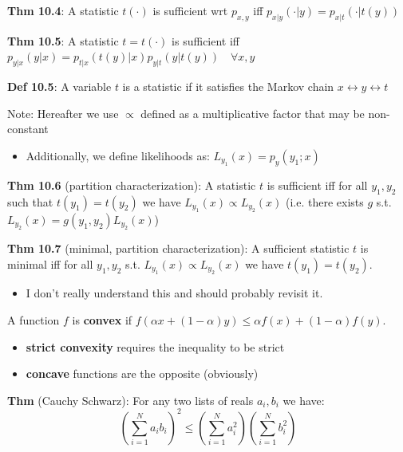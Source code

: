 \documentclass[12pt]{article} %
\begin{document}
\textbf{Thm 10.4}: A statistic $t(\cdot)$ is sufficient wrt $p_{x,y}$ iff $p_{x|y}(\cdot|y) = p_{x|t}(\cdot|t(y))$

\textbf{Thm 10.5}: A statistic $t = t(\cdot)$ is sufficient iff $p_{y|x}(y|x) = p_{t|x}(t(y)|x) p_{y|t}(y|t(y)) \quad \forall x,y$

\separate

\textbf{Def 10.5}: A variable $t$ is a statistic if it satisfies the Markov chain $x \leftrightarrow y \leftrightarrow t$

Note: Hereafter we use $\propto$ defined as a multiplicative factor that may be non-constant
\begin{itemize}[topsep=-1pt, itemsep=-1pt]
    \item Additionally, we define likelihoods as: $L_{y_1}(x) = p_y(y_1;x)$
\end{itemize}

\textbf{Thm 10.6} (partition characterization): A statistic $t$ is sufficient iff for all $y_1,y_2$ such that $t(y_1) = t(y_2)$ we have $L_{y_1}(x) \propto L_{y_2}(x)$ (i.e. there exists $g$ s.t. $L_{y_2}(x) = g(y_1, y_2) L_{y_2}(x)$)

\textbf{Thm 10.7} (minimal, partition characterization): A sufficient statistic $t$ is minimal iff for all $y_1, y_2$ s.t. $L_{y_1}(x) \propto L_{y_2}(x)$ we have $t(y_1) = t(y_2)$.
\begin{itemize}[topsep=-1pt, itemsep=-1pt]
    \item I don't really understand this and should probably revisit it.
\end{itemize}

\newpage
{}

A function $f$ is \textbf{convex} if $f(\alpha x + (1 - \alpha)y) \leq \alpha f(x) + (1-\alpha)f(y)$.
\begin{itemize}[topsep=-1pt, itemsep=-1pt]
    \item \textbf{strict convexity} requires the inequality to be strict
    \item \textbf{concave} functions are the opposite (obviously)
\end{itemize}


\textbf{Thm} (Cauchy Schwarz): For any two lists of reals $a_i,b_i$ we have:
\begin{equation*}
    \left(
    \sum_{i=1}^N a_ib_i
    \right)^2
    \leq
    \left(
    \sum_{i=1}^N a_i^2
    \right)
    \left(
    \sum_{i=1}^N b_i^2
    \right)
\end{equation*}
\end{document}
